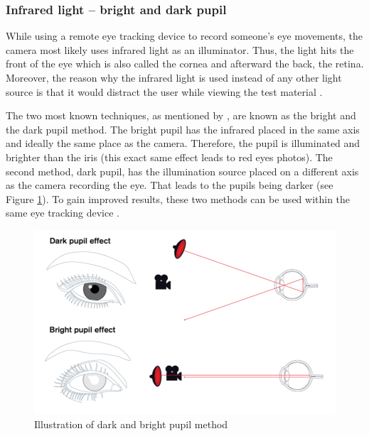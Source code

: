 \subsubsection{Infrared light -- bright and dark pupil}
While using a remote eye tracking device to record someone's eye movements, the camera most likely uses infrared light as an illuminator. Thus, the light hits the front of the eye which is also called the cornea and afterward the back, the retina. 
Moreover, the reason why the infrared light is used instead of any other light source is that it would distract the user while viewing the test material \autocite[]{poole2006eye, biedert2010eyebook}.

The two most known techniques, as mentioned by \textcite[]{goldberg2002eye}, are known as the bright and the dark pupil method. The bright pupil has the infrared placed in the same axis and ideally the same place as the camera. Therefore, the pupil is illuminated and brighter than the iris (this exact same effect leads to red eyes photos). The second method, dark pupil, has the illumination source placed on a different axis as the camera recording the eye. That leads to the pupils being darker (see Figure \ref{figure:DarkBright}). To gain improved results, these two methods can be used within the same eye tracking device \autocite[]{tobii2018dark, goldberg2002eye}. 

\begin{figure}[!ht]
    \centering
    \includegraphics[width=1\linewidth]{images/DarkBright.png}
    \caption{
        Illustration of dark and bright pupil method  \autocite[]{tobii2018dark}
    }
    \label{figure:DarkBright}
\end{figure}


